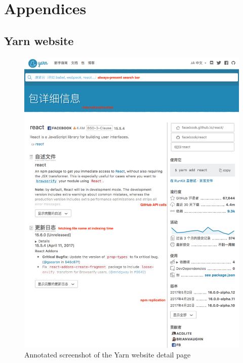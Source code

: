 \part*{Appendices}
\appendix

\chapter{Yarn website} %
\label{chp:appendix-yarn}

\begin{figure}[H]
  \centering
  \includegraphics[width=.7\textwidth]{../assets/yarn-detail-.png}
  \caption{Annotated screenshot of the Yarn website detail page}
  \label{figure:yarn-detail-page}
\end{figure}
